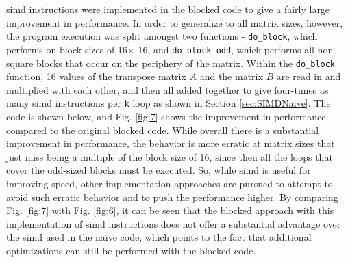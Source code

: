 \documentclass[10pt]{article}
\begin{document}
\gls{simd} instructions were implemented in the blocked code to give a fairly large improvement in performance. In order to generalize to all matrix sizes, however, the program execution was split amongst two functions - {\tt do\_block}, which performs on block sizes of 16\(\times\) 16, and {\tt do\_block\_odd}, which performs all non-square blocks that occur on the periphery of the matrix. Within the {\tt do\_block} function, 16 values of the transpose matrix \(A\) and the matrix \(B\) are read in and multiplied with each other, and then all added together to give four-times as many \gls{simd} instructions per {\tt k} loop as shown in Section \ref{sec:SIMDNaive}. The code is shown below, and Fig. \ref{fig:7} shows the improvement in performance compared to the original blocked code. While overall there is a substantial improvement in performance, the behavior is more erratic at matrix sizes that just miss being a multiple of the block size of 16, since then all the loops that cover the odd-sized blocks must be executed. So, while \gls{simd} is useful for improving speed, other implementation approaches are pursued to attempt to avoid such erratic behavior and to push the performance higher. By comparing Fig. \ref{fig:7} with Fig. \ref{fig:6}, it can be seen that the blocked approach with this implementation of \gls{simd} instructions does not offer a substantial advantage over the \gls{simd} used in the naive code, which points to the fact that additional optimizations can still be performed with the blocked code.
\end{document}
